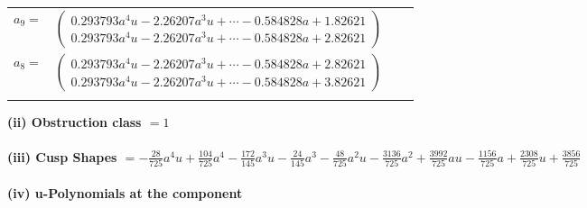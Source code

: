 \documentclass[1p]{elsarticle_modified}
\theoremstyle{definition}
\begin{document}
\begin{tabular}{m{7pt} m{180pt} m{7pt} m{180pt} }
\flushright $a_{9}=$&$\begin{pmatrix}0.293793 a^{4} u-2.26207 a^{3} u+\cdots-0.584828 a+1.82621\\0.293793 a^{4} u-2.26207 a^{3} u+\cdots-0.584828 a+2.82621\end{pmatrix}$ \\
\flushright $a_{8}=$&$\begin{pmatrix}0.293793 a^{4} u-2.26207 a^{3} u+\cdots-0.584828 a+2.82621\\0.293793 a^{4} u-2.26207 a^{3} u+\cdots-0.584828 a+3.82621\end{pmatrix}$\\&\end{tabular}
\flushleft \textbf{(ii) Obstruction class $= 1$}\\~\\
\flushleft \textbf{(iii) Cusp Shapes $= -\frac{28}{725} a^4 u+\frac{104}{725} a^4-\frac{172}{145} a^3 u-\frac{24}{145} a^3-\frac{48}{725} a^2 u-\frac{3136}{725} a^2+\frac{3992}{725} a u-\frac{1156}{725} a+\frac{2308}{725} u+\frac{3856}{725}$}\\~\\
\newpage\renewcommand{\arraystretch}{1}
\flushleft \textbf{(iv) u-Polynomials at the component}\newline \\
\end{document}
